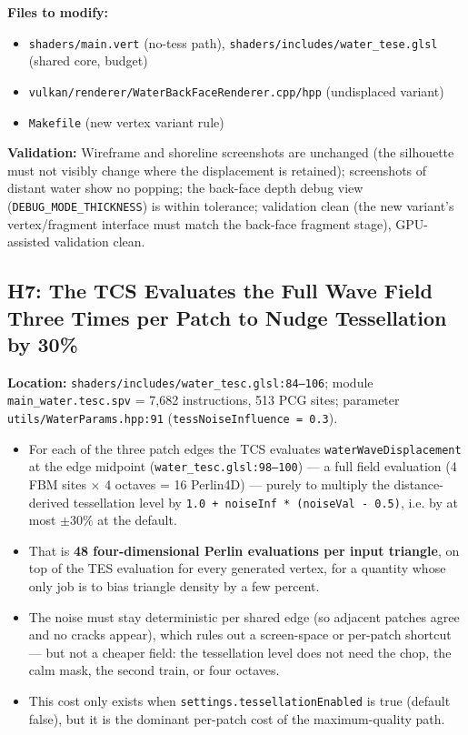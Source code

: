 \documentclass[11pt,a4paper]{article}
\begin{document}
\begin{tcolorbox}[promptbox={Prompt: Band-Limit the Vertex Wave Evaluation and Stop Displacing Back Faces}]
\textbf{Files to modify:}
\begin{itemize}
    \item \texttt{shaders/main.vert} (no-tess path), \texttt{shaders/includes/water\_tese.glsl} (shared core, budget)
    \item \texttt{vulkan/renderer/WaterBackFaceRenderer.cpp/hpp} (undisplaced variant)
    \item \texttt{Makefile} (new vertex variant rule)
\end{itemize}

\textbf{Validation:} Wireframe and shoreline screenshots are unchanged (the silhouette must not visibly change where the
displacement is retained); screenshots of distant water show no popping; the back-face depth debug view
(\texttt{DEBUG\_MODE\_THICKNESS}) is within tolerance; validation clean (the new variant's vertex/fragment interface must
match the back-face fragment stage), GPU-assisted validation clean.
\end{tcolorbox}

\subsection{H7: The TCS Evaluates the Full Wave Field Three Times per Patch to Nudge Tessellation by 30\%}

\textbf{Location:} \texttt{shaders/includes/water\_tesc.glsl:84--106}; module \texttt{main\_water.tesc.spv} = 7,682
instructions, 513 PCG sites; parameter \texttt{utils/WaterParams.hpp:91} (\texttt{tessNoiseInfluence = 0.3}).

\begin{itemize}
    \item For each of the three patch edges the TCS evaluates \texttt{waterWaveDisplacement} at the edge midpoint
    (\texttt{water\_tesc.glsl:98--100}) --- a full field evaluation (4 FBM sites $\times$ 4 octaves = 16 Perlin4D) ---
    purely to multiply the distance-derived tessellation level by
    \texttt{1.0 + noiseInf * (noiseVal - 0.5)}, i.e. by at most $\pm30\%$ at the default.
    \item That is \textbf{48 four-dimensional Perlin evaluations per input triangle}, on top of the TES evaluation for
    every generated vertex, for a quantity whose only job is to bias triangle density by a few percent.
    \item The noise must stay deterministic per shared edge (so adjacent patches agree and no cracks appear), which
    rules out a screen-space or per-patch shortcut --- but not a cheaper field: the tessellation level does not need the
    chop, the calm mask, the second train, or four octaves.
    \item This cost only exists when \texttt{settings.tessellationEnabled} is true (default false), but it is the
    dominant per-patch cost of the maximum-quality path.
\end{itemize}
\end{document}
